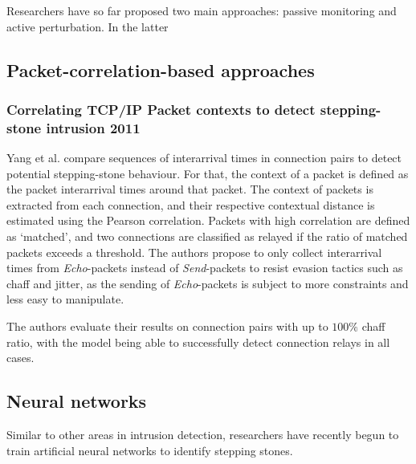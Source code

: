 \documentclass[runningheads]{llncs}\usepackage[]{graphicx}\usepackage[]{color}
\begin{document}
Researchers have so far proposed two main approaches: passive monitoring and active perturbation. In the latter

\subsection{Packet-correlation-based approaches}





\subsubsection{Correlating TCP/IP Packet contexts to detect stepping-stone intrusion 2011}

Yang et al. \cite{yang2011correlating} compare sequences of interarrival times in connection pairs to detect potential stepping-stone behaviour. For that, the context of a packet is defined as the packet interarrival times around that packet. The context of  packets is extracted from each connection, and their respective contextual distance is estimated using the Pearson correlation. Packets with high correlation are defined as `matched', and two connections are classified as relayed if the ratio of matched packets exceeds a threshold. The authors propose to only collect interarrival times from \textit{Echo}-packets instead of \textit{Send}-packets to resist evasion tactics such as chaff and jitter, as the sending of \textit{Echo}-packets is subject to more constraints and less easy to manipulate.

The authors evaluate their results on connection pairs with up to $100\%$ chaff ratio, with the model being able to successfully detect connection relays in all cases. 


\subsection{Neural networks}

Similar to other areas in intrusion detection, researchers have recently begun to train artificial neural networks to identify stepping stones. 
\end{document}
